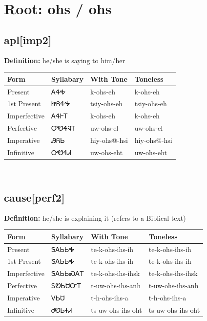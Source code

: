\documentclass{article}%
\begin{document}
%
\normalsize%
\section*{Root: ohs / ohs}%
\subsection*{apl[imp2]}%
\textbf{Definition: }%
he/she is saying to him/her%
\\[0.5em]%
\begin{tabular}{|l|l|l|l|}%
\hline%
\textbf{Form}&\textbf{Syllabary}&\textbf{With Tone}&\textbf{Toneless}\\%
\hline%
Present&ᎪᏎᎭ&k{-}ohs{-}eh&k{-}ohs{-}eh\\%
1st Present&ᏥᏲᏎᎭ&tsiy{-}ohs{-}eh&tsiy{-}ohs{-}eh\\%
Imperfective&ᎪᏎᎰᎢ&k{-}ohs{-}eh&k{-}ohs{-}eh\\%
Perfective&ᎤᏬᏎᎸᎢ&uw{-}ohs{-}el&uw{-}ohs{-}el\\%
Imperative&ᎯᏲᏏ&hiy{-}ohs@{-}hsi&hiy{-}ohs@{-}hsi\\%
Infinitive&ᎤᏬᏎᏗ&uw{-}ohs{-}eht&uw{-}ohs{-}eht\\%
\hline%
\end{tabular}%
\\[1em]%
\subsection*{cause[perf2]}%
\textbf{Definition: }%
he/she is explaining it (refers to a Biblical text)%
\\[0.5em]%
\begin{tabular}{|l|l|l|l|}%
\hline%
\textbf{Form}&\textbf{Syllabary}&\textbf{With Tone}&\textbf{Toneless}\\%
\hline%
Present&ᏕᎪᏏᏏᎭ&te{-}k{-}ohs{-}ihs{-}ih&te{-}k{-}ohs{-}ihs{-}ih\\%
1st Present&ᏕᎪᏏᏏᎭ&te{-}k{-}ohs{-}ihs{-}ih&te{-}k{-}ohs{-}ihs{-}ih\\%
Imperfective&ᏕᎪᏏᏏᏍᎪᎢ&te{-}k{-}ohs{-}ihs{-}ihsk&te{-}k{-}ohs{-}ihs{-}ihsk\\%
Perfective&ᏚᏬᏏᏌᏅᎢ&t{-}uw{-}ohs{-}ihs{-}anh&t{-}uw{-}ohs{-}ihs{-}anh\\%
Imperative&ᏙᏏᏌ&t{-}h{-}ohs{-}ihs{-}a&t{-}h{-}ohs{-}ihs{-}a\\%
Infinitive&ᏧᏬᏏᏐᏗ&ts{-}uw{-}ohs{-}ihs{-}oht&ts{-}uw{-}ohs{-}ihs{-}oht\\%
\hline%
\end{tabular}%
\\[1em]%
\end{document}

